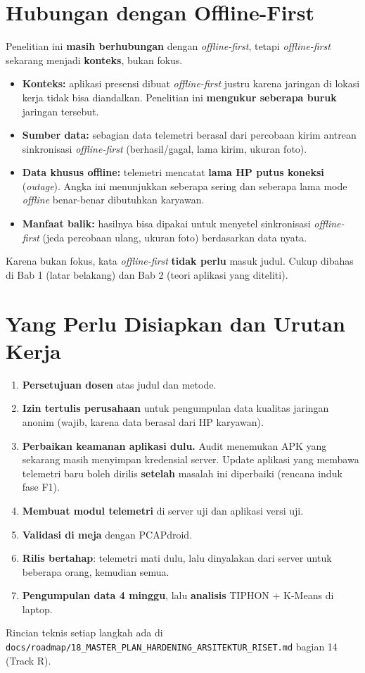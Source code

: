 \documentclass[11pt,a4paper]{article}
\begin{document}
\section{Hubungan dengan Offline-First}
Penelitian ini \textbf{masih berhubungan} dengan \textit{offline-first}, tetapi \textit{offline-first} sekarang menjadi \textbf{konteks}, bukan fokus.
\begin{itemize}
\item \textbf{Konteks:} aplikasi presensi dibuat \textit{offline-first} justru karena jaringan di lokasi kerja tidak bisa diandalkan. Penelitian ini \textbf{mengukur seberapa buruk} jaringan tersebut.
\item \textbf{Sumber data:} sebagian data telemetri berasal dari percobaan kirim antrean sinkronisasi \textit{offline-first} (berhasil/gagal, lama kirim, ukuran foto).
\item \textbf{Data khusus offline:} telemetri mencatat \textbf{lama HP putus koneksi} (\textit{outage}). Angka ini menunjukkan seberapa sering dan seberapa lama mode \textit{offline} benar-benar dibutuhkan karyawan.
\item \textbf{Manfaat balik:} hasilnya bisa dipakai untuk menyetel sinkronisasi \textit{offline-first} (jeda percobaan ulang, ukuran foto) berdasarkan data nyata.
\end{itemize}
Karena bukan fokus, kata \textit{offline-first} \textbf{tidak perlu} masuk judul. Cukup dibahas di Bab 1 (latar belakang) dan Bab 2 (teori aplikasi yang diteliti).

\section{Yang Perlu Disiapkan dan Urutan Kerja}
\begin{enumerate}
\item \textbf{Persetujuan dosen} atas judul dan metode.
\item \textbf{Izin tertulis perusahaan} untuk pengumpulan data kualitas jaringan anonim (wajib, karena data berasal dari HP karyawan).
\item \textbf{Perbaikan keamanan aplikasi dulu.} Audit menemukan APK yang sekarang masih menyimpan kredensial server. Update aplikasi yang membawa telemetri baru boleh dirilis \textbf{setelah} masalah ini diperbaiki (rencana induk fase F1).
\item \textbf{Membuat modul telemetri} di server uji dan aplikasi versi uji.
\item \textbf{Validasi di meja} dengan PCAPdroid.
\item \textbf{Rilis bertahap}: telemetri mati dulu, lalu dinyalakan dari server untuk beberapa orang, kemudian semua.
\item \textbf{Pengumpulan data 4 minggu}, lalu \textbf{analisis} TIPHON + K-Means di laptop.
\end{enumerate}
Rincian teknis setiap langkah ada di \texttt{docs/roadmap/18\_MASTER\_PLAN\_HARDENING\_ARSITEKTUR\_RISET.md} bagian 14 (Track R).
\end{document}
